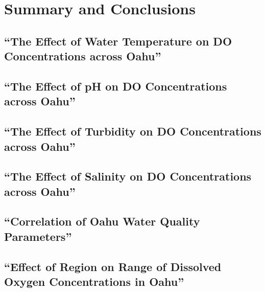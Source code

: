 \documentclass[12pt,]{article}
\begin{document}
\section{Summary and Conclusions}\label{summary-and-conclusions}

\newpage

\listoftables 

\subsection{\texorpdfstring{``The Effect of Water Temperature on DO
Concentrations across
Oahu''}{The Effect of Water Temperature on DO Concentrations across Oahu}}\label{the-effect-of-water-temperature-on-do-concentrations-across-oahu}

\subsection{\texorpdfstring{``The Effect of pH on DO Concentrations
across
Oahu''}{The Effect of pH on DO Concentrations across Oahu}}\label{the-effect-of-ph-on-do-concentrations-across-oahu}

\subsection{\texorpdfstring{``The Effect of Turbidity on DO
Concentrations across
Oahu''}{The Effect of Turbidity on DO Concentrations across Oahu}}\label{the-effect-of-turbidity-on-do-concentrations-across-oahu}

\subsection{\texorpdfstring{``The Effect of Salinity on DO
Concentrations across
Oahu''}{The Effect of Salinity on DO Concentrations across Oahu}}\label{the-effect-of-salinity-on-do-concentrations-across-oahu}

\subsection{\texorpdfstring{``Correlation of Oahu Water Quality
Parameters''}{Correlation of Oahu Water Quality Parameters}}\label{correlation-of-oahu-water-quality-parameters}

\subsection{\texorpdfstring{``Effect of Region on Range of Dissolved
Oxygen Concentrations in
Oahu''}{Effect of Region on Range of Dissolved Oxygen Concentrations in Oahu}}\label{effect-of-region-on-range-of-dissolved-oxygen-concentrations-in-oahu}
\end{document}
